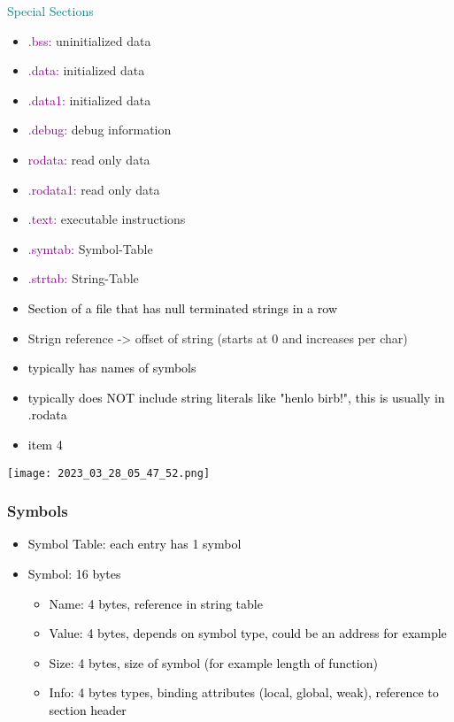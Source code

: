 \documentclass[main.tex,fontsize=8pt,paper=a4,paper=portrait,DIV=calc,]{scrartcl}
\begin{document}
\textcolor{teal}{Special Sections}
\begin{itemize}
  \item \textcolor{purple}{.bss:} uninitialized data
  \item \textcolor{purple}{.data:} initialized data
  \item \textcolor{purple}{.data1:} initialized data
  \item \textcolor{purple}{.debug:} debug information
\item \textcolor{purple}{rodata:} read only data
\item \textcolor{purple}{.rodata1: } read only data
\item \textcolor{purple}{.text: } executable instructions 
\item \textcolor{purple}{.symtab: } Symbol-Table 
\item \textcolor{purple}{.strtab: } String-Table 
\end{itemize} 

\begin{itemize}
\item \textcolor{black}{Section of a file that has null terminated strings in a row}
\item Strign reference -> offset of string (starts at 0 and increases per char) 
\item \textcolor{black}{typically has names of symbols}
\item \textcolor{black}{typically does NOT include string literals like "henlo birb!", this is usually in .rodata}
\item \textcolor{black}{item 4}
\end{itemize} 
\texttt{[image: 2023\_03\_28\_05\_47\_52.png]}

\subsubsection{Symbols}
\begin{itemize}
\item \textcolor{black}{Symbol Table: each entry has 1 symbol}
\item \textcolor{black}{Symbol: 16 bytes}\newline
  \begin{itemize}
  \item \textcolor{black}{Name: 4 bytes, reference in string table}
  \item \textcolor{black}{Value: 4 bytes, depends on symbol type, could be an address for example}
  \item \textcolor{black}{Size: 4 bytes, size of symbol (for example length of function)}
  \item \textcolor{black}{Info: 4 bytes types, binding attributes (local, global, weak), reference to section header}
  \end{itemize} 
\end{itemize} 
\end{document}
